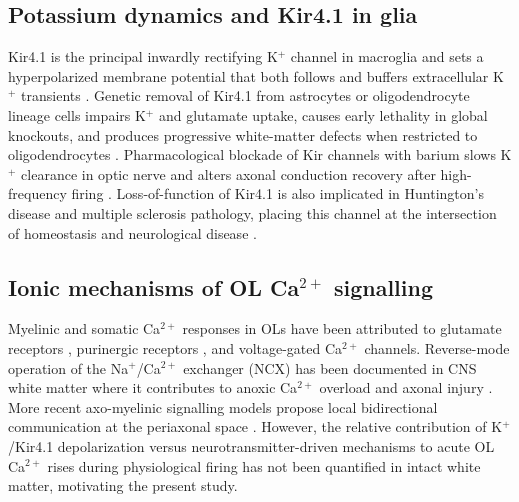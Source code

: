 \subsection{Potassium dynamics and Kir4.1 in glia}

Kir4.1 is the principal inwardly rectifying K$^+$ channel in macroglia and sets a hyperpolarized membrane potential that both follows and buffers extracellular K$^+$ transients \citep{Kofuji2000,Olsen2015,Hawkins2017}. Genetic removal of Kir4.1 from astrocytes or oligodendrocyte lineage cells impairs K$^+$ and glutamate uptake, causes early lethality in global knockouts, and produces progressive white-matter defects when restricted to oligodendrocytes \citep{Djukic2007,Neusch2001,Larson2018,Schirmer2018}. Pharmacological blockade of Kir channels with barium slows K$^+$ clearance in optic nerve and alters axonal conduction recovery after high-frequency firing \citep{Bay2012,Larson2018}. Loss-of-function of Kir4.1 is also implicated in Huntington's disease and multiple sclerosis pathology, placing this channel at the intersection of homeostasis and neurological disease \citep{Tong2014,Schirmer2018,Stumpf2019}.

\subsection{Ionic mechanisms of OL Ca$^{2+}$ signalling}

Myelinic and somatic Ca$^{2+}$ responses in OLs have been attributed to glutamate receptors \citep{Micu2006,Saab2016}, purinergic receptors \citep{Kettenmann2013}, and voltage-gated Ca$^{2+}$ channels. Reverse-mode operation of the Na$^+$/Ca$^{2+}$ exchanger (NCX) has been documented in CNS white matter where it contributes to anoxic Ca$^{2+}$ overload and axonal injury \citep{Stys1992}. More recent axo-myelinic signalling models propose local bidirectional communication at the periaxonal space \citep{Micu2018}. However, the relative contribution of K$^+$/Kir4.1 depolarization versus neurotransmitter-driven mechanisms to acute OL Ca$^{2+}$ rises during physiological firing has not been quantified in intact white matter, motivating the present study.
